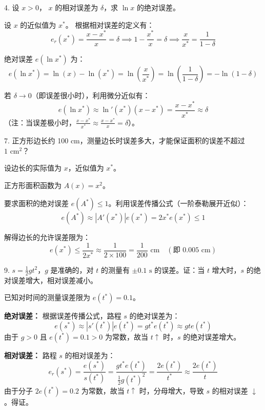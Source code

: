\documentclass[11pt, a4paper]{ctexart} %
\begin{document}
\begin{problem}{4. 设 $x > 0$， $x$ 的相对误差为 $\delta$，求 $\ln x$ 的绝对误差。}
\end{problem}

\begin{solution}
    设 $x$ 的近似值为 $x^*$。
    根据相对误差的定义有：
    \[
        e_r(x^*) = \frac{x - x^*}{x} = \delta \implies 1 - \frac{x^*}{x} = \delta \implies \frac{x}{x^*} = \frac{1}{1-\delta}
    \]
    
    绝对误差 $e(\ln x^*)$ 为：
    \[
        e(\ln x^*) = \ln(x) - \ln(x^*) = \ln\left(\frac{x}{x^*}\right) = \ln\left(\frac{1}{1-\delta}\right) = -\ln(1-\delta)
    \]
    
    若 $\delta \to 0$（即误差很小时），利用微分近似有：
    \[
        e(\ln x^*) \approx \ln'(x^*) (x - x^*) = \frac{x - x^*}{x^*} \approx \delta
    \]
    （注：当误差极小时，$\frac{x-x^*}{x^*} \approx \frac{x-x^*}{x} = \delta$）。
\end{solution}


\begin{problem}{7. 正方形边长约 100 cm，测量边长时误差多大，才能保证面积的误差不超过 $1\text{ cm}^2$？}
\end{problem}

\begin{solution}
    设边长的实际值为 $x$，近似值为 $x^*$。
    
    正方形面积函数为 $A(x) = x^2$。
    
    要求面积的绝对误差 $e(A^*) \le 1$。利用误差传播公式（一阶泰勒展开近似）：
    \[
        e(A^*) \approx |A'(x^*)| e(x^*) = 2x^* e(x^*) \le 1
    \]
    
    解得边长的允许误差限为：
    \[
        e(x^*) \le \frac{1}{2x^*} \approx \frac{1}{2 \times 100} = \frac{1}{200} \text{ cm} \quad (\text{即 } 0.005 \text{ cm})
    \]
\end{solution}


\begin{problem}{9. $s = \frac{1}{2}gt^2$，$g$ 是准确的，对 $t$ 的测量有 $\pm 0.1 \text{ s}$ 的误差。证：当 $t$ 增大时，$s$ 的绝对误差增大，相对误差减小。}
\end{problem}

\begin{solution}
    已知对时间的测量误差限为 $e(t^*) = 0.1$。
    
    \textbf{绝对误差：} 根据误差传播公式，路程 $s$ 的绝对误差为：
    \[
        e(s^*) \approx |s'(t^*)| e(t^*) = gt^* e(t^*) \approx gt e(t^*)
    \]
    由于 $g > 0$ 且 $e(t^*) = 0.1 > 0$ 为常数，故当 $t \uparrow$ 时，$s$ 的绝对误差增大。
    
    \textbf{相对误差：} 路程 $s$ 的相对误差为：
    \[
        e_r(s^*) = \frac{e(s^*)}{s(t^*)} = \frac{gt^* e(t^*)}{\frac{1}{2}g(t^*)^2} = \frac{2e(t^*)}{t^*} \approx \frac{2e(t^*)}{t}
    \]
    由于分子 $2e(t^*) = 0.2$ 为常数，故当 $t \uparrow$ 时，分母增大，导致 $s$ 的相对误差 $\downarrow$。得证。
\end{solution}
\end{document}
